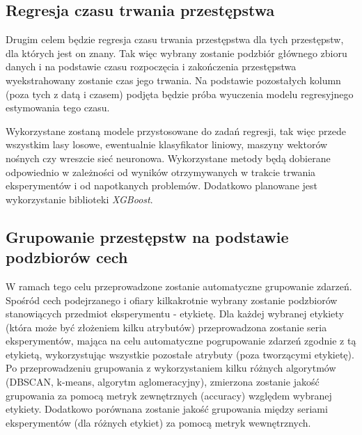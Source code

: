 \documentclass{classrep}
\begin{document}
{        \subsection{Regresja czasu trwania przestępstwa}
        \label{project_goal_2} {
            Drugim celem będzie regresja czasu trwania przestępstwa dla tych
            przestępstw, dla których jest on znany. Tak więc wybrany zostanie podzbiór
            głównego zbioru danych i na podstawie czasu rozpoczęcia i zakończenia
            przestępstwa wyekstrahowany zostanie czas jego trwania. Na podstawie
            pozostałych kolumn (poza tych z datą i czasem) podjęta będzie próba
            wyuczenia modelu regresyjnego estymowania tego czasu.

            Wykorzystane zostaną modele przystosowane do zadań regresji, tak więc
            przede wszystkim lasy losowe, ewentualnie klasyfikator liniowy, maszyny
            wektorów nośnych czy wreszcie sieć neuronowa. Wykorzystane metody będą
            dobierane odpowiednio w zależności od wyników otrzymywanych w trakcie
            trwania eksperymentów i od napotkanych problemów. Dodatkowo planowane jest
            wykorzystanie biblioteki \emph{XGBoost}.
        }

        \subsection{Grupowanie przestępstw na podstawie podzbiorów cech}
        \label{project_goal_3} {
            W ramach tego celu przeprowadzone zostanie automatyczne grupowanie zdarzeń.
            Spośród cech podejrzanego i ofiary kilkakrotnie wybrany zostanie podzbiorów
            stanowiących przedmiot eksperymentu - etykietę. Dla każdej wybranej
            etykiety (która może być złożeniem kilku atrybutów) przeprowadzona zostanie
            seria eksperymentów, mająca na celu automatyczne pogrupowanie zdarzeń
            zgodnie z tą etykietą, wykorzystując wszystkie pozostałe atrybuty (poza
            tworzącymi etykietę). Po przeprowadzeniu grupowania z wykorzystaniem kilku
            różnych algorytmów (DBSCAN, k-means, algorytm aglomeracyjny), zmierzona
            zostanie jakość grupowania za pomocą metryk zewnętrznych (accuracy)
            względem wybranej etykiety. Dodatkowo porównana zostanie jakość grupowania
            między seriami eksperymentów (dla różnych etykiet) za pomocą metryk
            wewnętrznych.
        }

    }
\end{document}
